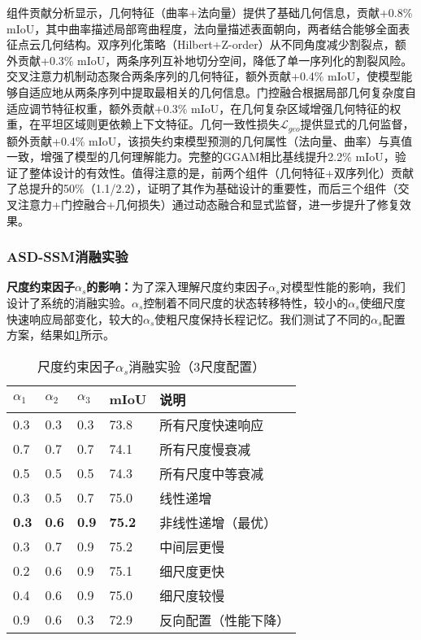 \documentclass[preprint,12pt]{elsarticle}
\begin{document}
组件贡献分析显示，几何特征（曲率+法向量）提供了基础几何信息，贡献+0.8\% mIoU，其中曲率描述局部弯曲程度，法向量描述表面朝向，两者结合能够全面表征点云几何结构。双序列化策略（Hilbert+Z-order）从不同角度减少割裂点，额外贡献+0.3\% mIoU，两条序列互补地切分空间，降低了单一序列化的割裂风险。交叉注意力机制动态聚合两条序列的几何特征，额外贡献+0.4\% mIoU，使模型能够自适应地从两条序列中提取最相关的几何信息。门控融合根据局部几何复杂度自适应调节特征权重，额外贡献+0.3\% mIoU，在几何复杂区域增强几何特征的权重，在平坦区域则更依赖上下文特征。几何一致性损失$\mathcal{L}_{geo}$提供显式的几何监督，额外贡献+0.4\% mIoU，该损失约束模型预测的几何属性（法向量、曲率）与真值一致，增强了模型的几何理解能力。完整的GGAM相比基线提升2.2\% mIoU，验证了整体设计的有效性。值得注意的是，前两个组件（几何特征+双序列化）贡献了总提升的50\%（1.1/2.2），证明了其作为基础设计的重要性，而后三个组件（交叉注意力+门控融合+几何损失）通过动态融合和显式监督，进一步提升了修复效果。

\subsubsection{ASD-SSM消融实验}

\textbf{尺度约束因子$\alpha_s$的影响：}为了深入理解尺度约束因子$\alpha_s$对模型性能的影响，我们设计了系统的消融实验。$\alpha_s$控制着不同尺度的状态转移特性，较小的$\alpha_s$使细尺度快速响应局部变化，较大的$\alpha_s$使粗尺度保持长程记忆。我们测试了不同的$\alpha_s$配置方案，结果如\cref{tab:alpha_ablation}所示。

\begin{table}[htbp!]
	\centering
	\caption{尺度约束因子$\alpha_s$消融实验（3尺度配置）}
	\label{tab:alpha_ablation}
	\begin{tabular}{@{}lllll@{}}
		\toprule
		$\alpha_1$ & $\alpha_2$ & $\alpha_3$ & mIoU & 说明 \\ 
		\midrule
		0.3 & 0.3 & 0.3 & 73.8 & 所有尺度快速响应 \\
		0.7 & 0.7 & 0.7 & 74.1 & 所有尺度慢衰减 \\
		0.5 & 0.5 & 0.5 & 74.3 & 所有尺度中等衰减 \\
		\midrule
		0.3 & 0.5 & 0.7 & 75.0 & 线性递增 \\
		\textbf{0.3} & \textbf{0.6} & \textbf{0.9} & \textbf{75.2} & 非线性递增（最优） \\
		0.3 & 0.7 & 0.9 & 75.2 & 中间层更慢 \\
		0.2 & 0.6 & 0.9 & 75.1 & 细尺度更快 \\
		0.4 & 0.6 & 0.9 & 75.0 & 细尺度较慢 \\
		\midrule
		0.9 & 0.6 & 0.3 & 72.9 & 反向配置（性能下降） \\
		\bottomrule
	\end{tabular}
\end{table}
\end{document}
